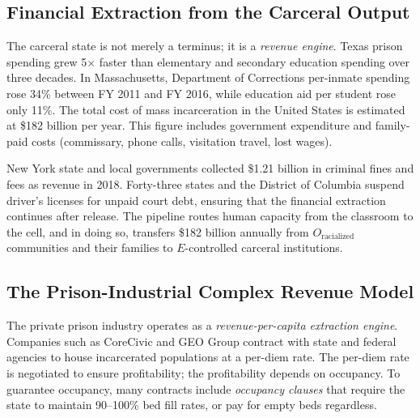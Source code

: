 \subsection{Financial Extraction from the Carceral Output}

The carceral state is not merely a terminus; it is a \textit{revenue engine}. Texas prison spending grew 5$\times$ faster than elementary and secondary education spending over three decades. In Massachusetts, Department of Corrections per-inmate spending rose 34\% between FY 2011 and FY 2016, while education aid per student rose only 11\%. The total cost of mass incarceration in the United States is estimated at \$182 billion per year. This figure includes government expenditure and family-paid costs (commissary, phone calls, visitation travel, lost wages).

New York state and local governments collected \$1.21 billion in criminal fines and fees as revenue in 2018. Forty-three states and the District of Columbia suspend driver's licenses for unpaid court debt, ensuring that the financial extraction continues after release. The pipeline routes human capacity from the classroom to the cell, and in doing so, transfers \$182 billion annually from $O_{\text{racialized}}$ communities and their families to $E$-controlled carceral institutions.

\subsection{The Prison-Industrial Complex Revenue Model}

The private prison industry operates as a \textit{revenue-per-capita extraction engine}. Companies such as CoreCivic and GEO Group contract with state and federal agencies to house incarcerated populations at a per-diem rate. The per-diem rate is negotiated to ensure profitability; the profitability depends on occupancy. To guarantee occupancy, many contracts include \textit{occupancy clauses} that require the state to maintain 90--100\% bed fill rates, or pay for empty beds regardless.

